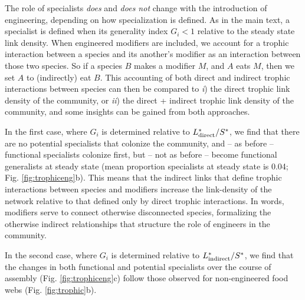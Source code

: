 \documentclass[twocolumn,preprintnumbers,amsmath,amssymb,superscriptaddress,linenumbers]{revtex4-1}
\begin{document}
The role of specialists \emph{does} and \emph{does not} change with the introduction of engineering, depending on how specialization is defined.
As in the main text, a specialist is defined when its generality index $G_i < 1$ relative to the steady state link density.
When engineered modifiers are included, we account for a trophic interaction between a species and its another's modifier as an interaction between those two species.
So if a species $B$ makes a modifier $M$, and $A$ eats $M$, then we set $A$ to (indirectly) eat $B$.
This accounting of both direct and indirect trophic interactions between species can then be compared to \emph{i}) the direct trophic link density of the community, or \emph{ii}) the direct + indirect trophic link density of the community, and some insights can be gained from both approaches.

In the first case, where $G_i$ is determined relative to $L^*_{\rm direct}/S^*$, we find that there are no potential specialists that colonize the community, and -- as before -- functional specialists colonize first, but -- not as before -- become functional generalists at steady state (mean proportion specialists at steady state is 0.04; Fig. \ref{fig:trophiceng}b).
This means that the indirect links that define trophic interactions between species and modifiers increase the link-density of the network relative to that defined only by direct trophic interactions.
In words, modifiers serve to connect otherwise disconnected species, formalizing the otherwise indirect relationships that structure the role of engineers in the community.

In the second case, where $G_i$ is determined relative to $L^*_{\rm indirect}/S^*$, we find that the changes in both functional and potential specialists over the course of assembly (Fig. \ref{fig:trophiceng}c) follow those observed for non-engineered food webs (Fig. \ref{fig:trophic}b).


% 
\end{document}
